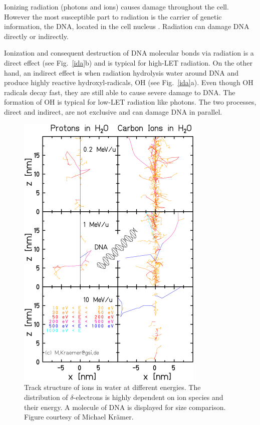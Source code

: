 \documentclass[type=dr, dr=rernat, accentcolor=tud7b,colorbacktitle, bigchapter, openright, twoside, 12pt ]{tudthesis}
\begin{document}
Ionizing radiation (photons and ions) causes damage throughout the cell. However the most susceptible part to radiation is the
carrier of genetic information, the DNA, located in the cell nucleus \cite{Munro1970}. Radiation can damage DNA directly or indirectly.

Ionization and consequent destruction of DNA molecular bonds via radiation is a direct effect (see Fig.~\ref{ida}b) and is typical for high-LET radiation. On the other hand, an indirect effect is when radiation hydrolysis water around DNA and produce highly reactive hydroxyl-radicals, OH 
(see Fig.~\ref{ida}a). Even though OH radicals decay fast, they are still able to cause severe damage to DNA. The formation of OH is typical for low-LET radiation like photons. The two processes, direct and indirect, are not exclusive and can damage DNA in parallel.


\newpage

\begin{figure}[H]
\begin{center}
\includegraphics[width=0.8\textwidth]{./Images/trackstructure.png}
\caption{Track structure of ions in water at different energies. The distribution of $\delta$-electrons is highly dependent on ion species and their energy.
A molecule of DNA is displayed for size comparison. Figure courtesy of Michael Kr\"amer.}
\label{track}
\end{center}
\end{figure}
\end{document}
